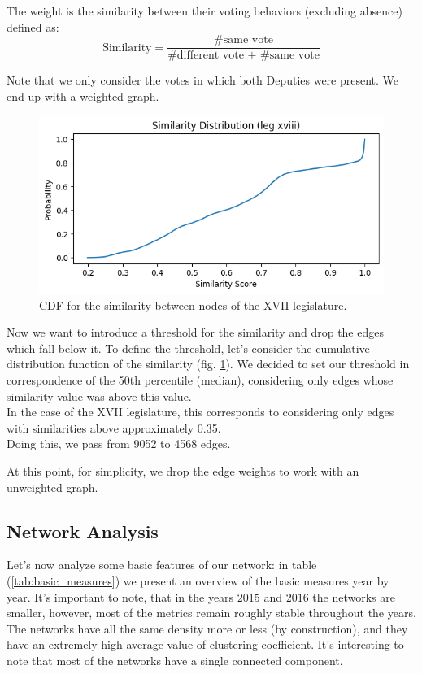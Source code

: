 The weight is the similarity between their voting behaviors (excluding absence) defined as:
\begin{equation}
    \text{Similarity} = \dfrac{\text{\#same vote}}{\text{\#different vote + \#same vote}}
\end{equation}

Note that we only consider the votes in which both Deputies were present.
 We end up with a weighted graph.\\


\begin{figure}[h]
  \centering
  \includegraphics[width=\linewidth]{img/similarity_xvii.png}
  \caption{CDF for the similarity between nodes of the XVII legislature.}
  \label{fig:cdf}
\end{figure}

Now we want to introduce a threshold for the similarity and drop the edges which fall below it.
To define the threshold, let's consider the cumulative distribution function of the similarity (fig. \ref{fig:cdf}).
We decided to set our threshold in correspondence of the 50th percentile (median), considering only edges whose similarity value was above this value.\\
In the case of the XVII legislature,
 this corresponds to considering only edges with similarities above approximately 0.35.\\
Doing this, we pass from 9052
 to 4568 edges.


At this point, for simplicity, we drop the edge weights to work with an unweighted graph.\\

\subsection{Network Analysis}


Let's now analyze some basic features of our network: in table (\ref{tab:basic_measures}) we present an overview of the basic measures year by year.
It's important to note, that in the years $2015$ and $2016$ the networks are smaller, however, most of the metrics remain roughly stable throughout the years. The networks have all the same density more or less (by construction), and they have an extremely high average value of clustering coefficient. It's interesting to note that most of the networks have a single connected component.\\


